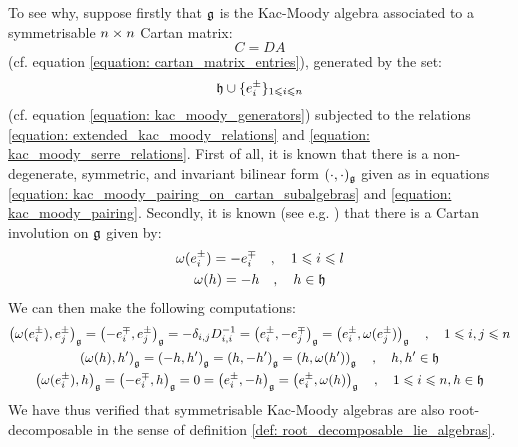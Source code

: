 \begin{example}
            To see why, suppose firstly that $\mathfrak{g}$ is the Kac-Moody algebra associated to a symmetrisable $n \x n$ Cartan matrix:
                $$C = DA$$
            (cf. equation \eqref{equation: cartan_matrix_entries}), generated by the set:
                $$\mathfrak{h} \cup \{e_i^{\pm}\}_{1\leqslant i \leqslant n}$$
            (cf. equation \ref{equation: kac_moody_generators}) subjected to the relations \eqref{equation: extended_kac_moody_relations} and \eqref{equation: kac_moody_serre_relations}. First of all, it is known that there is a non-degenerate, symmetric, and invariant bilinear form $(\cdot, \cdot)_{\mathfrak{g}}$ given as in equations \eqref{equation: kac_moody_pairing_on_cartan_subalgebras} and \eqref{equation: kac_moody_pairing}. Secondly, it is known (see e.g. \cite[Theorem 1.2]{kac_infinite_dimensional_lie_algebras}) that there is a Cartan involution on $\mathfrak{g}$ given by:
                \begin{equation} \label{equation: symmetrisable_kac_moody_cartan_involution}
                    \begin{gathered}
                        \omega(e_i^{\pm}) = -e_i^{\mp} \quad, \quad 1 \leqslant i \leqslant l
                        \\
                        \omega(h) = -h \quad, \quad h \in \mathfrak{h}
                    \end{gathered}
                \end{equation}
            We can then make the following computations:
                \begin{equation} \label{equation: kac_moody_pairing_cartan_equivariance}
                    \begin{gathered}
                        \left( \omega(e_i^{\pm}), e_j^{\pm} \right)_{\mathfrak{g}} = \left( -e_i^{\mp}, e_j^{\pm} \right)_{\mathfrak{g}} = -\delta_{i, j} D_{i, i}^{-1} = \left( e_i^{\pm}, -e_j^{\mp} \right)_{\mathfrak{g}} = \left( e_i^{\pm}, \omega(e_j^{\pm}) \right)_{\mathfrak{g}} \quad, \quad 1 \leqslant i, j \leqslant n
                        \\
                        \left( \omega(h), h' \right)_{\mathfrak{g}} = \left( -h, h' \right)_{\mathfrak{g}} = \left( h, -h' \right)_{\mathfrak{g}} = \left( h, \omega(h') \right)_{\mathfrak{g}} \quad, \quad h, h' \in \mathfrak{h}
                        \\
                        \left( \omega(e_i^{\pm}), h \right)_{\mathfrak{g}} = \left( -e_i^{\mp}, h \right)_{\mathfrak{g}} = 0 = \left( e_i^{\pm}, -h \right)_{\mathfrak{g}} = \left( e_i^{\pm}, \omega(h) \right)_{\mathfrak{g}} \quad, \quad 1 \leqslant i \leqslant n, h \in \mathfrak{h}
                    \end{gathered}
                \end{equation}
            We have thus verified that symmetrisable Kac-Moody algebras are also root-decomposable in the sense of definition \ref{def: root_decomposable_lie_algebras}.
        \end{example}

